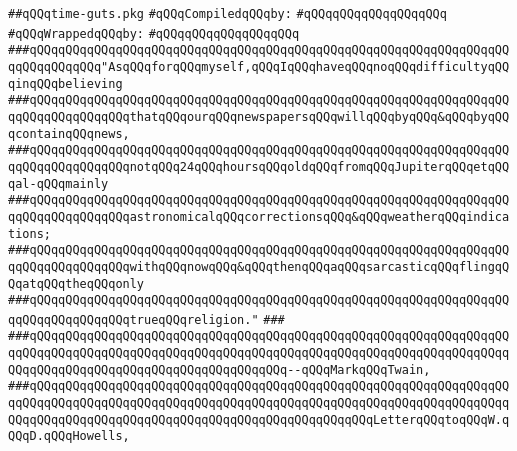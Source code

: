 \label{src/lib/std/src/time-guts.pkg}
\verb|##qQQqtime-guts.pkg|\newline
\newline
\verb|#qQQqCompiledqQQqby:|\newline
\verb|#qQQqqQQqqQQqqQQqqQQq|\newline
\newline
\verb|#qQQqWrappedqQQqby:|\newline
\verb|#qQQqqQQqqQQqqQQqqQQq|\newline
\newline
\newline
\newline
\verb|###qQQqqQQqqQQqqQQqqQQqqQQqqQQqqQQqqQQqqQQqqQQqqQQqqQQqqQQqqQQqqQQqqQQqqQQqqQQqqQQq"AsqQQqforqQQqmyself,qQQqIqQQqhaveqQQqnoqQQqdifficultyqQQqinqQQqbelieving|\newline
\verb|###qQQqqQQqqQQqqQQqqQQqqQQqqQQqqQQqqQQqqQQqqQQqqQQqqQQqqQQqqQQqqQQqqQQqqQQqqQQqqQQqqQQqthatqQQqourqQQqnewspapersqQQqwillqQQqbyqQQq&qQQqbyqQQqcontainqQQqnews,|\newline
\verb|###qQQqqQQqqQQqqQQqqQQqqQQqqQQqqQQqqQQqqQQqqQQqqQQqqQQqqQQqqQQqqQQqqQQqqQQqqQQqqQQqqQQqnotqQQq24qQQqhoursqQQqoldqQQqfromqQQqJupiterqQQqetqQQqal-qQQqmainly|\newline
\verb|###qQQqqQQqqQQqqQQqqQQqqQQqqQQqqQQqqQQqqQQqqQQqqQQqqQQqqQQqqQQqqQQqqQQqqQQqqQQqqQQqqQQqastronomicalqQQqcorrectionsqQQq&qQQqweatherqQQqindications;|\newline
\verb|###qQQqqQQqqQQqqQQqqQQqqQQqqQQqqQQqqQQqqQQqqQQqqQQqqQQqqQQqqQQqqQQqqQQqqQQqqQQqqQQqqQQqwithqQQqnowqQQq&qQQqthenqQQqaqQQqsarcasticqQQqflingqQQqatqQQqtheqQQqonly|\newline
\verb|###qQQqqQQqqQQqqQQqqQQqqQQqqQQqqQQqqQQqqQQqqQQqqQQqqQQqqQQqqQQqqQQqqQQqqQQqqQQqqQQqqQQqtrueqQQqreligion."|\newline
\verb|###|\newline
\verb|###qQQqqQQqqQQqqQQqqQQqqQQqqQQqqQQqqQQqqQQqqQQqqQQqqQQqqQQqqQQqqQQqqQQqqQQqqQQqqQQqqQQqqQQqqQQqqQQqqQQqqQQqqQQqqQQqqQQqqQQqqQQqqQQqqQQqqQQqqQQqqQQqqQQqqQQqqQQqqQQqqQQqqQQqqQQqqQQq--qQQqMarkqQQqTwain,|\newline
\verb|###qQQqqQQqqQQqqQQqqQQqqQQqqQQqqQQqqQQqqQQqqQQqqQQqqQQqqQQqqQQqqQQqqQQqqQQqqQQqqQQqqQQqqQQqqQQqqQQqqQQqqQQqqQQqqQQqqQQqqQQqqQQqqQQqqQQqqQQqqQQqqQQqqQQqqQQqqQQqqQQqqQQqqQQqqQQqqQQqqQQqqQQqqQQqLetterqQQqtoqQQqW.qQQqD.qQQqHowells,|\newline
